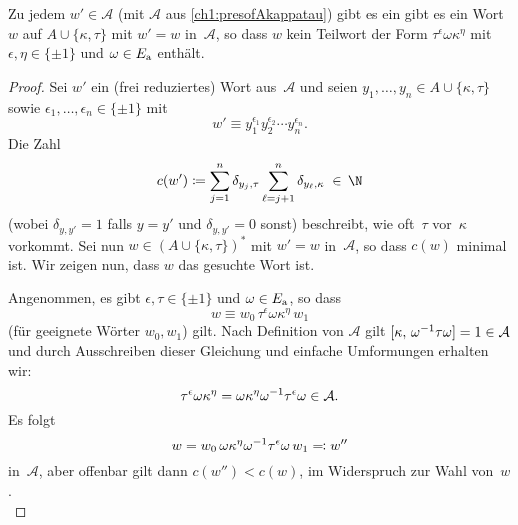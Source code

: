\begin{thLemma}\label{ch1:wordsinAkappatau}
    Zu jedem $w'\in\mathcal A$ (mit $\mathcal A$ aus
    \cref{ch1:presofAkappatau}) gibt es ein
    gibt es ein Wort~$w$ auf $A\cup\{\kappa,\tau\}$
    mit $w'=w$ in~$\mathcal A$, so dass $w$ kein
    Teilwort der Form $\tau^\epsilon\omega\kappa^\eta$
    mit $\epsilon,\eta\in\{\pm1\}$ und $\omega\in E_{\mathrm a}$ enthält.
\end{thLemma}
%
\begin{proof}
    Sei $w'$ ein (frei reduziertes) Wort aus~$\mathcal A$
    und seien $y_1,\dots,y_n\in A\cup\{\kappa,\tau\}$ sowie
    $\epsilon_1,\dots,\epsilon_n\in\{\pm1\}$
    mit
    \[ w' \equiv
        y_1^{\epsilon_1}y_2^{\epsilon_2}\cdots y_n^{\epsilon_n}
    . \]
    Die Zahl
    \[ c(w') \defeq \sum_{j=1}^n \delta_{y_j,\tau}
                        \sum_{\ell=j+1}^n \delta_{y_\ell,\kappa}
        \;\in\,\N
    \]
    (wobei $\delta_{y,y'} = 1$ falls $y=y'$ und $\delta_{y,y'} = 0$ sonst)
    beschreibt, wie oft~$\tau$ vor~$\kappa$ vorkommt.
    Sei nun $w\in (A\cup\{\kappa,\tau\})^*$ mit $w'=w$ in~$\mathcal A$,
    so dass $c(w)$ minimal ist. Wir zeigen nun, dass $w$ das gesuchte
    Wort ist.
    
    Angenommen, es gibt $\epsilon,\tau\in\{\pm1\}$ und $\omega\in E_{\mathrm a}$,
    so dass
    \[ w \equiv w_0 \, \tau^\epsilon\omega\kappa^\eta \, w_1 \]
    (für geeignete Wörter $w_0,w_1$) gilt. Nach Definition
    von $\mathcal A$ gilt $\cu[\kappa, \omega\inv\tau\omega] = 1
    \in\mathcal A$ und durch Ausschreiben dieser Gleichung und einfache
    Umformungen erhalten wir:
    \[ \tau^\epsilon\omega\kappa^\eta
        = \omega\kappa^\eta\omega^{-1}\tau^\epsilon\omega
        \in\mathcal A
    . \]
    Es folgt
    \[ w = w_0 \, \omega\kappa^\eta\omega^{-1}\tau^\epsilon\omega \, w_1
        \eqqcolon w''
    \]
    in~$\mathcal A$, aber offenbar gilt dann $c(w'') < c(w)$, im
    Widerspruch zur Wahl von~$w$.
    \\
\end{proof}

